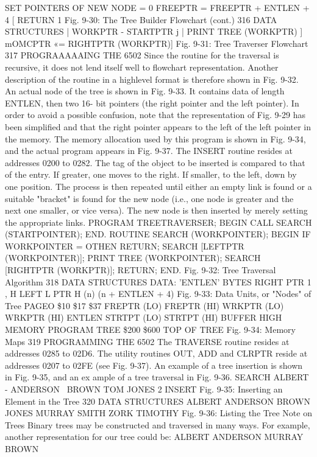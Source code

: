 \documentclass{book}
\begin{document}
{{{{{{{{{{{{{{{{{{{{{{{{{{{{{SET POINTERS OF
NEW NODE = 0
FREEPTR = FREEPTR
+ ENTLEN + 4
[ RETURN 1
Fig. 9-30: The Tree Builder Flowchart (cont.)
316
DATA STRUCTURES
| WORKPTR - STARTPTR j
| PRINT TREE (WORKPTR) ]
mOMCPTR «= RIGHTPTR (WORKPTR)]
Fig. 9-31: Tree Traverser Flowchart
317
PROGRAAAAAING THE 6502
Since the routine for the traversal is recursive, it does not lend itself well
to flowchart representation. Another description of the routine in a highlevel
format is therefore shown in Fig. 9-32. An actual node of the tree
is shown in Fig. 9-33. It contains data of length ENTLEN, then two 16-
bit pointers (the right pointer and the left pointer). In order to avoid a
possible confusion, note that the representation of Fig. 9-29 has been
simplified and that the right pointer appears to the left of the left
pointer in the memory. The memory allocation used by this program is
shown in Fig. 9-34, and the actual program appears in Fig. 9-37.
The INSERT routine resides at addresses 0200 to 0282. The tag
of the object to be inserted is compared to that of the entry. If greater,
one moves to the right. If smaller, to the left, down by one position.
The process is then repeated until either an empty link is found or a
suitable "bracket" is found for the new node (i.e., one node is greater
and the next one smaller, or vice versa). The new node is then inserted
by merely setting the appropriate links.
PROGRAM TREETRAVERSER;
BEGIN
CALL SEARCH (STARTPOINTER);
END.
ROUTINE SEARCH (WORKPOINTER);
BEGIN
IF WORKPOINTER = OTHEN RETURN;
SEARCH [LEFTPTR (WORKPOINTER)];
PRINT TREE (WORKPOINTER);
SEARCH [RIGHTPTR (WORKPTR)];
RETURN;
END.
Fig. 9-32: Tree Traversal Algorithm
318
DATA STRUCTURES
DATA: 'ENTLEN' BYTES
RIGHT PTR
1 , H
LEFT
L
PTR
H
(n) (n + ENTLEN + 4)
Fig. 9-33: Data Units, or "Nodes" of Tree
PAGEO
\$10
\$17
\$37
FREPTR (LO)
FREPTR (HI)
WRKPTR (LO)
WRKPTR (HI)
ENTLEN
STRTPT (LO)
STRTPT (HI)
BUFFER
HIGH MEMORY
PROGRAM
TREE
\$200
\$600
TOP OF TREE
Fig. 9-34: Memory Maps
319
PROGRAMMING THE 6502
The TRAVERSE routine resides at addresses 0285 to 02D6. The
utility routines OUT, ADD and CLRPTR reside at addresses 0207
to 02FE (see Fig. 9-37).
An example of a tree insertion is shown in Fig. 9-35, and an ex
ample of a tree traversal in Fig. 9-36.
SEARCH
ALBERT
-
ANDERSON
\
BROWN
TOM
JONES
2 INSERT
Fig. 9-35: Inserting an Element in the Tree
320
DATA STRUCTURES
ALBERT ANDERSON BROWN JONES MURRAY
SMITH ZORK
TIMOTHY
Fig. 9-36: Listing the Tree
Note on Trees
Binary trees may be constructed and traversed in many ways.
For example, another representation for our tree could be:
ALBERT
ANDERSON MURRAY
BROWN
}}}}}}}}}}}}}}}}}}}}}}}}}}}}}
\end{document}

